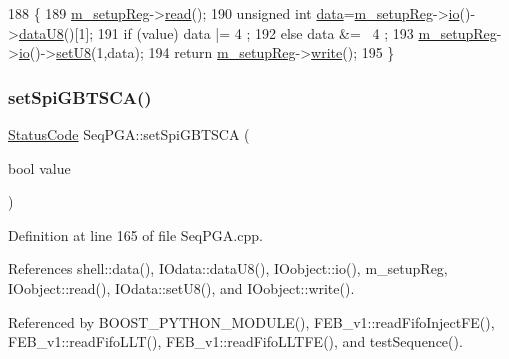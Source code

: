 \begin{DoxyCode}
188                                            \{
189   \hyperlink{classSeqPGA_a03269241e7fc26493cd0595beda334c2}{m\_setupReg}->\hyperlink{classIOobject_aa07610c11963b1db6710e3c76ceea456}{read}();
190   \textcolor{keywordtype}{unsigned} \textcolor{keywordtype}{int} \hyperlink{namespaceshell_a5ea2525995cedc3efd69ea8a7f034d1e}{data}=\hyperlink{classSeqPGA_a03269241e7fc26493cd0595beda334c2}{m\_setupReg}->\hyperlink{classIOobject_af04fb94137c3d86849f478ac5afab5d1}{io}()->\hyperlink{classIOdata_a75e9c318dbac3a39402179070943d4bc}{dataU8}()[1];
191   \textcolor{keywordflow}{if} (value)  data |=  4 ;
192   \textcolor{keywordflow}{else}        data &= ~4 ;
193   \hyperlink{classSeqPGA_a03269241e7fc26493cd0595beda334c2}{m\_setupReg}->\hyperlink{classIOobject_af04fb94137c3d86849f478ac5afab5d1}{io}()->\hyperlink{classIOdata_a6c4fb2f2af01889ada889c2b7aceb24d}{setU8}(1,data);
194   \textcolor{keywordflow}{return} \hyperlink{classSeqPGA_a03269241e7fc26493cd0595beda334c2}{m\_setupReg}->\hyperlink{classIOobject_a9f6984bc9f0fadcf800f1be2523ac744}{write}();
195 \}
\end{DoxyCode}
\mbox{\label{classSeqPGA_ae5449d6970bffd8de3670a8a1ce6942d}} 
\subsubsection{\texorpdfstring{set\+Spi\+G\+B\+T\+S\+C\+A()}{setSpiGBTSCA()}}
{\footnotesize\ttfamily \hyperlink{classStatusCode}{Status\+Code} Seq\+P\+G\+A\+::set\+Spi\+G\+B\+T\+S\+CA (\begin{DoxyParamCaption}\item[{bool}]{value }\end{DoxyParamCaption})}



Definition at line 165 of file Seq\+P\+G\+A.\+cpp.



References shell\+::data(), I\+Odata\+::data\+U8(), I\+Oobject\+::io(), m\+\_\+setup\+Reg, I\+Oobject\+::read(), I\+Odata\+::set\+U8(), and I\+Oobject\+::write().



Referenced by B\+O\+O\+S\+T\+\_\+\+P\+Y\+T\+H\+O\+N\+\_\+\+M\+O\+D\+U\+L\+E(), F\+E\+B\+\_\+v1\+::read\+Fifo\+Inject\+F\+E(), F\+E\+B\+\_\+v1\+::read\+Fifo\+L\+L\+T(), F\+E\+B\+\_\+v1\+::read\+Fifo\+L\+L\+T\+F\+E(), and test\+Sequence().


